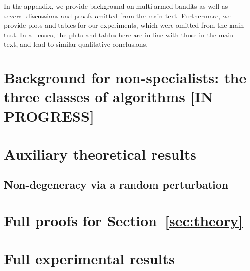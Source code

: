 \documentclass[11pt]{article}
\begin{document}












\newpage
\gaedit{

}

\newpage
{}


\begin{small}

\end{small}

\clearpage
\begin{appendices}

In the appendix, we provide background on multi-armed bandits as well as several discussions and proofs omitted from the main text. Furthermore, we provide plots and tables for our experiments, which were omitted from the main text. In all cases, the plots and tables here are in line with those in the main text, and lead to similar qualitative conclusions.

\section{Background for non-specialists: the three classes of algorithms [IN PROGRESS]}
\label{sec:related-classes}


\section{Auxiliary theoretical results}
\label{app:examples}


\subsection{Non-degeneracy via a random perturbation}
\label{app:perturb}


\newpage
\section{Full proofs for Section~\ref{sec:theory}}
\label{sec:theory-proofs}


\newpage
\section{Full experimental results}
\label{app:expts}



%

\end{appendices}
\end{document}
